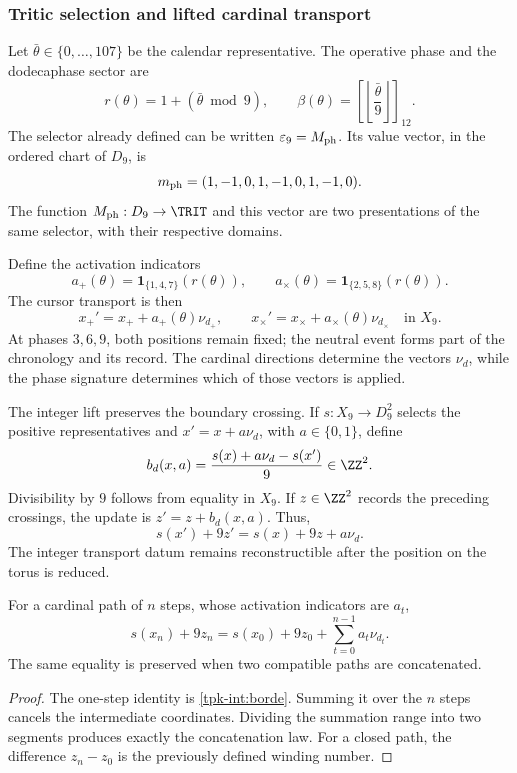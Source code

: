 \subsubsection{Tritic selection and lifted cardinal transport}
\label{tpk-int:seleccion}

Let \(\bar\theta\in\{0,\ldots,107\}\) be the calendar representative.
The operative phase and the dodecaphase sector are
\begin{equation}
 r(\theta)=1+(\bar\theta\bmod9),\qquad
 \beta(\theta)=\left[\left\lfloor\frac{\bar\theta}{9}\right\rfloor\right]_{12}.
 \label{tpk-int:fase}
\end{equation}
The selector already defined can be written \(\varepsilon_9=M_{\rm ph}\).
Its value vector, in the ordered chart of \(D_9\), is
\[
 m_{\rm ph}=(1,-1,0,1,-1,0,1,-1,0).
\]
The function \(M_{\rm ph}:D_9\to\TRIT\) and this vector are two
presentations of the same selector, with their respective domains.

Define the activation indicators
\[
 a_+(\theta)=\mathbf1_{\{1,4,7\}}(r(\theta)),\qquad
 a_\times(\theta)=\mathbf1_{\{2,5,8\}}(r(\theta)).
\]
The cursor transport is then
\begin{equation}
 x_+'=x_++a_+(\theta)\nu_{d_+},\qquad
 x_\times'=x_\times+a_\times(\theta)\nu_{d_\times}
 \quad\text{in }X_9.
 \label{tpk-int:cursores}
\end{equation}
At phases \(3,6,9\), both positions remain fixed; the neutral event
forms part of the chronology and its record. The cardinal directions
determine the vectors \(\nu_d\), while the phase signature determines
which of those vectors is applied.

The integer lift preserves the boundary crossing. If
\(s:X_9\to D_9^2\) selects the positive representatives and
\(x'=x+a\nu_d\), with \(a\in\{0,1\}\), define
\begin{equation}
 b_d(x,a)=\frac{s(x)+a\nu_d-s(x')}{9}\in\ZZ^2.
 \label{tpk-int:borde}
\end{equation}
Divisibility by \(9\) follows from equality in \(X_9\).
If \(z\in\ZZ^2\) records the preceding crossings, the update is
\(z'=z+b_d(x,a)\). Thus,
\[
 s(x')+9z'=s(x)+9z+a\nu_d.
\]
The integer transport datum remains reconstructible after the
position on the torus is reduced.

\begin{proposition}
\label{tpk-int:prop-desplazamiento}
For a cardinal path of \(n\) steps, whose activation indicators
are \(a_t\),
\[
 s(x_n)+9z_n=s(x_0)+9z_0+
 \sum_{t=0}^{n-1}a_t\nu_{d_t}.
\]
The same equality is preserved when two compatible paths are concatenated.
\end{proposition}
\begin{proof}
The one-step identity is \eqref{tpk-int:borde}. Summing it over the
\(n\) steps cancels the intermediate coordinates. Dividing the summation
range into two segments produces exactly the concatenation law. For a
closed path, the difference \(z_n-z_0\) is the previously defined
winding number.
\end{proof}

